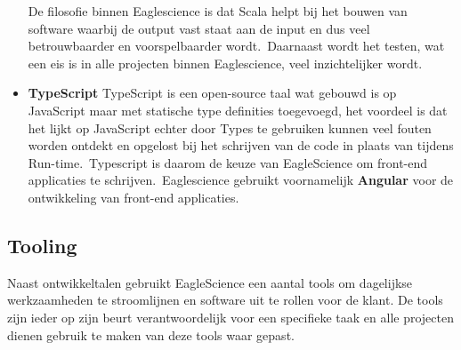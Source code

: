 \begin{itemize}
De filosofie binnen Eaglescience is dat Scala helpt bij het bouwen van software waarbij de output vast staat aan de input en dus veel betrouwbaarder en voorspelbaarder wordt.\ Daarnaast wordt het testen, wat een eis is in alle projecten binnen Eaglescience, veel inzichtelijker wordt.
\item \textbf{TypeScript} TypeScript is een open-source taal wat gebouwd is op JavaScript maar met statische type definities toegevoegd, het voordeel is dat het lijkt op JavaScript echter door Types te gebruiken kunnen veel fouten worden ontdekt en opgelost bij het schrijven van de code in plaats van tijdens Run-time.\ Typescript is daarom de keuze van EagleScience om front-end applicaties te schrijven.\ Eaglescience gebruikt voornamelijk \textbf{Angular} voor de ontwikkeling van front-end applicaties.

\end{itemize}

\subsection{Tooling}
Naast ontwikkeltalen gebruikt EagleScience een aantal tools om dagelijkse werkzaamheden te stroomlijnen en software uit te rollen voor de klant. De tools zijn ieder op zijn beurt verantwoordelijk voor een specifieke taak en alle projecten dienen gebruik te maken van deze tools waar gepast.

